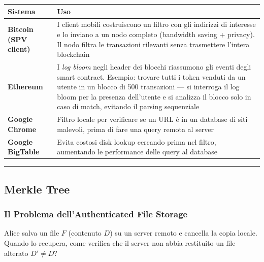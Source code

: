 \documentclass[
  italian,
  openany]{book}
\newcounter{none} %
\begin{document}
{\def\LTcaptype{none} %
\begin{longtable}[]{@{}
  >{\raggedright\arraybackslash}p{}
  >{\raggedright\arraybackslash}p{}@{}}
\toprule\noalign{}
\begin{minipage}[b]{\linewidth}\raggedright
Sistema
\end{minipage} & \begin{minipage}[b]{\linewidth}\raggedright
Uso
\end{minipage} \\
\midrule\noalign{}
\endhead
\bottomrule\noalign{}
\endlastfoot
\textbf{Bitcoin (SPV client)} & I client mobili costruiscono un filtro
con gli indirizzi di interesse e lo inviano a un nodo completo
(bandwidth saving + privacy). Il nodo filtra le transazioni rilevanti
senza trasmettere l'intera blockchain \\
\textbf{Ethereum} & I \emph{log bloom} negli header dei blocchi
riassumono gli eventi degli smart contract. Esempio: trovare tutti i
token venduti da un utente in un blocco di 500 transazioni --- si
interroga il log bloom per la presenza dell'utente e si analizza il
blocco solo in caso di match, evitando il parsing sequenziale \\
\textbf{Google Chrome} & Filtro locale per verificare se un URL è in un
database di siti malevoli, prima di fare una query remota al server \\
\textbf{Google BigTable} & Evita costosi disk lookup cercando prima nel
filtro, aumentando le performance delle query al database \\
\end{longtable}
}

\begin{center}\rule{0.5\linewidth}{0.5pt}\end{center}

\subsection{Merkle Tree}\label{merkle-tree}

\subsubsection{Il Problema dell'Authenticated File
Storage}\label{il-problema-dellauthenticated-file-storage}

Alice salva un file \(F\) (contenuto \(D\)) su un server remoto e
cancella la copia locale. Quando lo recupera, come verifica che il
server non abbia restituito un file alterato \(D' \neq D\)?
\end{document}
